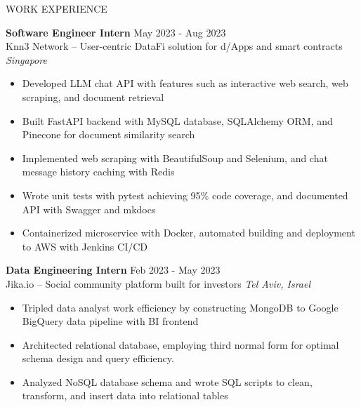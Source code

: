 \documentclass{resume} %
\begin{document}
\begin{rSection}{WORK EXPERIENCE}

	\textbf{Software Engineer Intern} \hfill May 2023 - Aug 2023\\
	Knn3 Network – User-centric DataFi solution for d/Apps and smart contracts  \hfill \textit{Singapore}
	\begin{itemize}
		\item Developed LLM chat API with features such as interactive web search, web scraping, and document retrieval
		\item Built FastAPI backend with MySQL database, SQLAlchemy ORM, and Pinecone for document similarity search
		\item Implemented web scraping with BeautifulSoup and Selenium, and chat message history caching with Redis
		\item Wrote unit tests with pytest achieving 95\% code coverage, and documented API with Swagger and mkdocs
		\item Containerized microservice with Docker, automated building and deployment to AWS with Jenkins CI/CD
	\end{itemize}

	\textbf{Data Engineering Intern} \hfill Feb 2023 - May 2023\\
	Jika.io – Social community platform built for investors \hfill \textit{Tel Aviv, Israel}
	\begin{itemize}
		\item Tripled data analyst work efficiency by constructing MongoDB to Google BigQuery data pipeline with BI frontend
		\item Architected relational database, employing third normal form for optimal schema design and query efficiency.
		\item Analyzed NoSQL database schema and wrote SQL scripts to clean, transform, and insert data into relational tables
	\end{itemize}

\end{rSection}

\end{document}
